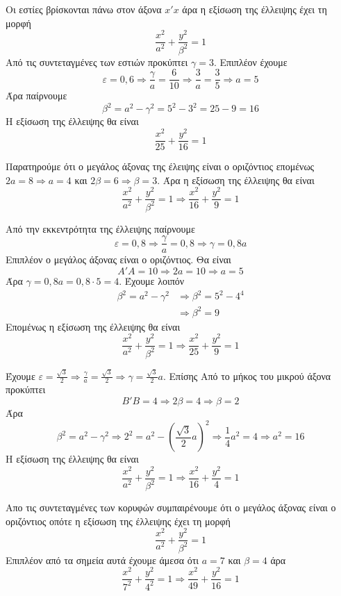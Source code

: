\begin{alist}
\item Οι εστίες βρίσκονται πάνω στον άξονα $ x'x $ άρα η εξίσωση της έλλειψης έχει τη μορφή
\[ \frac{x^2}{a^2}+\frac{y^2}{\beta^2}=1 \]
Από τις συντεταγμένες των εστιών προκύπτει $\gamma=3$. Επιπλέον έχουμε
\[ \varepsilon=0{,}6\Rightarrow\frac{\gamma}{a}=\frac{6}{10}\Rightarrow \frac{3}{a}=\frac{3}{5}\Rightarrow a=5 \]
Άρα παίρνουμε
\[ \beta^2=a^2-\gamma^2=5^2-3^2=25-9=16 \]
Η εξίσωση της έλλειψης θα είναι
\[ \frac{x^2}{25}+\frac{y^2}{16}=1 \]
\item Παρατηρούμε ότι ο μεγάλος άξονας της έλειψης είναι ο οριζόντιος επομένως $ 2a=8\Rightarrow a=4 $ και $ 2\beta=6\Rightarrow\beta=3 $. Άρα η εξίσωση της έλλειψης θα είναι 
\[ \frac{x^2}{a^2}+\frac{y^2}{\beta^2}=1\Rightarrow\frac{x^2}{16}+\frac{y^2}{9}=1 \]
\item Από την εκκεντρότητα της έλλειψης παίρνουμε
\[ \varepsilon=0{,}8\Rightarrow \frac{\gamma}{a}=0{,}8\Rightarrow \gamma=0{,}8a \]
Επιπλέον ο μεγάλος άξονας είναι ο οριζόντιος. Θα είναι
\[ A'A=10\Rightarrow 2a=10\Rightarrow a=5 \]
Άρα $ \gamma=0{,}8a=0{,}8\cdot 5=4 $. Έχουμε λοιπόν
\begin{align}
\beta^2=a^2-\gamma^2&\Rightarrow \beta^2=5^2-4^4\\&\Rightarrow \beta^2=9
\end{align}
Επομένως η εξίσωση της έλλειψης θα είναι
\[ \frac{x^2}{a^2}+\frac{y^2}{\beta^2}=1\Rightarrow \frac{x^2}{25}+\frac{y^2}{9}=1 \]
\item Έχουμε $ \varepsilon=\frac{\sqrt{3}}{2}\Rightarrow \frac{\gamma}{a}=\frac{\sqrt{3}}{2}\Rightarrow \gamma =\frac{\sqrt{3}}{2} a $. Επίσης Από το μήκος του μικρού άξονα προκύπτει
\[ B'B=4\Rightarrow 2\beta=4\Rightarrow \beta=2 \]
Άρα
\[ \beta^2=a^2-\gamma^2\Rightarrow 2^2=a^2-\left(\frac{\sqrt{3}}{2}a\right)^2\Rightarrow \frac{1}{4}a^2=4\Rightarrow a^2=16 \]
Η εξίσωση της έλλειψης θα είναι
\[ \frac{x^2}{a^2}+\frac{y^2}{\beta^2}=1\Rightarrow\frac{x^2}{16}+\frac{y^2}{4}=1 \]
\item Απο τις συντεταγμένες των κορυφών συμπαιρένουμε ότι ο μεγάλος άξονας είναι ο οριζόντιος οπότε η εξίσωση της έλλειψης έχει τη μορφή
\[ \frac{x^2}{a^2}+\frac{y^2}{\beta^2}=1 \]
Επιπλέον από τα σημεία αυτά έχουμε άμεσα ότι $a=7$ και $\beta=4$ άρα
\[ \frac{x^2}{7^2}+\frac{y^2}{4^2}=1\Rightarrow \frac{x^2}{49}+\frac{y^2}{16}=1 \]
\end{alist}
